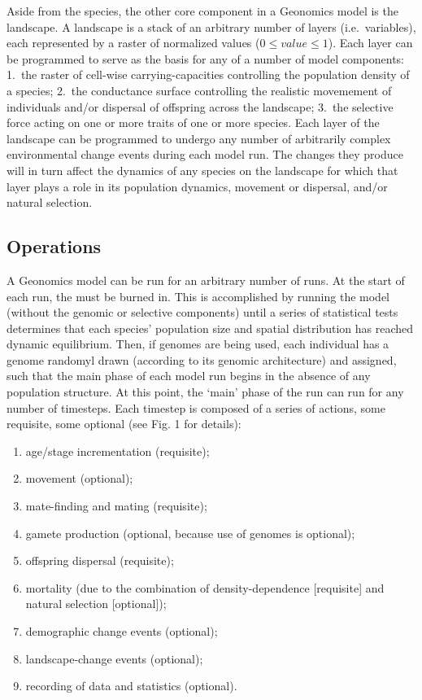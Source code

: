 ﻿\documentclass{article}
\begin{document}
Aside from the species, the other core component in a Geonomics model is the landscape.
A landscape is a stack of an arbitrary number of layers (i.e.\ variables),
each represented by a raster of normalized values ($0 \leq value \leq 1$).
Each layer can be programmed to serve as the basis for any of a number of model components:
1.\ the raster of cell-wise carrying-capacities controlling the population density of a species;
2.\ the conductance surface controlling the realistic movemement of individuals and/or 
dispersal of offspring across the landscape;
3.\ the selective force acting on one or more traits  of one or more species.
Each layer of the landscape can be programmed to undergo any number of arbitrarily complex environmental
change events during each model run.
The changes they produce will in turn affect the dynamics
of any species on the landscape for which that layer plays a role in its
population dynamics, movement or dispersal, and/or natural selection.


\subsection{Operations}
A Geonomics model can be run for an arbitrary number of runs.
At the start of each run, the must be burned in.
This is accomplished by running the model (without the genomic or
selective components) until a series of statistical tests determines that each species'
population size and spatial distribution has reached dynamic equilibrium.
Then, if genomes are being used, each individual has a genome randomyl drawn
(according to its genomic architecture) and assigned, such that the main phase
of each model run begins in the absence of any population structure.
At this point, the `main' phase of the run can run for any number of timesteps. 
Each timestep is composed of a series of actions, some requisite, some optional (see Fig. 1 for details):
\begin{enumerate}
  \item age/stage incrementation (requisite);
  \item movement (optional);
  \item mate-finding and  mating (requisite);
  \item gamete production (optional, because use of genomes is optional);
  \item offspring dispersal (requisite);
  \item mortality (due to the combination of density-dependence [requisite] and natural selection [optional]);
  \item demographic change events (optional);
  \item landscape-change events (optional);
  \item recording of data and statistics (optional). 
\end{enumerate}
\end{document}
